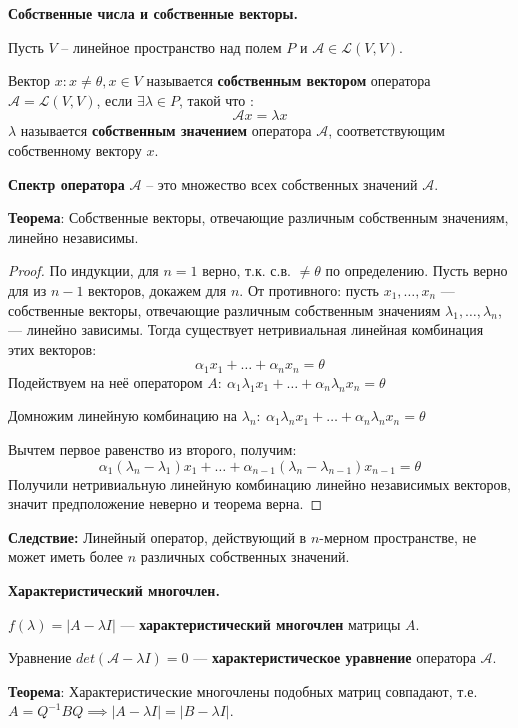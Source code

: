 \centerline{\textbf{Собственные числа и собственные векторы.}}

Пусть $V$ -- линейное пространство над полем $P$ и $\mathcal{A} \in \mathcal{L}(V, V)$.

Вектор $x: x\neq \theta, x \in V$ называется \textbf{собственным вектором} оператора $\mathcal{A}  = \mathcal{L}(V, V)$, если $\exists \lambda \in P$, такой что : 
$$\mathcal{A}x = \lambda x$$
$\lambda$ называется \textbf{собственным значением} оператора $\mathcal{A}$, соответствующим собственному вектору $x$.

\textbf{Спектр оператора} $\mathcal{A}$ -- это множество всех собственных значений $\mathcal{A}$.

\textbf{Теорема}: Собственные векторы, отвечающие различным собственным значениям, линейно независимы.

\begin{proof}
По индукции, для $n=1$ верно, т.к. с.в. $\neq \theta$ по определению. Пусть верно для из $n-1$ векторов, докажем для $n$.
От противного: пусть $x_1,\dots,x_n$ --- собственные векторы, отвечающие различным собственным значениям $\lambda_1,\dots,\lambda_n$, --- линейно зависимы. 
Тогда существует нетривиальная линейная комбинация этих векторов:
$$ \alpha_1x_1+\dots+\alpha_nx_n=\theta$$
Подействуем на неё оператором $A:~\alpha_1\lambda_1x_1+\dots+\alpha_n\lambda_nx_n=\theta$

Домножим линейную комбинацию на $\lambda_n:~\alpha_1\lambda_nx_1+\dots+\alpha_n\lambda_nx_n=\theta$

Вычтем первое равенство из второго, получим:
$$\alpha_1(\lambda_n-\lambda_1)x_1+\dots+\alpha_{n-1}(\lambda_n-\lambda_{n-1})x_{n-1}=\theta$$
Получили нетривиальную линейную комбинацию линейно независимых векторов, значит предположение неверно и теорема верна.
\end{proof}

\textbf{Следствие:} Линейный оператор, действующий в $n$-мерном пространстве, не может иметь более $n$ различных собственных значений.


\centerline{\textbf{Характеристический многочлен.}}

$f(\lambda) = |A - \lambda I|$ --- \textbf{характеристический многочлен} матрицы $A$.

Уравнение $det(\mathcal{A} - \lambda I) = 0$ --- \textbf{характеристическое уравнение} оператора $\mathcal{A}$.

\textbf{Теорема}: Характеристические многочлены подобных матриц совпадают, т.е.
    $A = Q^{-1}BQ \implies |A - \lambda I| = |B - \lambda I|$.

